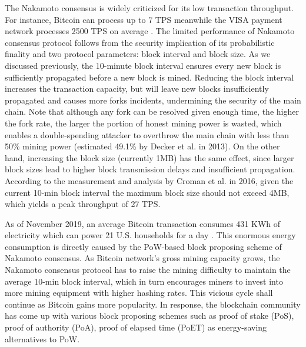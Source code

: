 The Nakamoto consensus is widely criticized for its low transaction throughput. For instance, Bitcoin can process up to 7 TPS meanwhile the VISA payment network processes 2500 TPS on average . The limited performance of Nakamoto consensus protocol follows from the security implication of its probabilistic finality and two protocol parameters: block interval and block size. As we discussed previously, the 10-minute block interval ensures every new block is sufficiently propagated before a new block is mined. Reducing the block interval increases the transaction capacity, but will leave new blocks insufficiently propagated and causes more forks incidents, undermining the security of the main chain. Note that although any fork can be resolved given enough time, the higher the fork rate, the larger the portion of honest mining power is wasted, which enables a double-spending attacker to overthrow the main chain with less than 50\% mining power (estimated 49.1\% by Decker et al.  in 2013). On the other hand, increasing the block size (currently 1MB) has the same effect, since larger block sizes lead to higher block transmission delays and  insufficient propagation. According to the measurement and analysis by Croman et al.  in 2016, given the current 10-min block interval the maximum block size should not exceed 4MB, which yields a peak throughput of 27 TPS.

As of November 2019, an average Bitcoin transaction consumes 431 KWh of electricity which can power 21 U.S. households for a day . This enormous energy consumption is directly caused by the PoW-based block proposing scheme of Nakamoto consensus. As Bitcoin network's gross mining capacity grows, the Nakamoto consensus protocol has to raise the mining difficulty to maintain the average 10-min block interval, which in turn encourages miners to invest into more mining equipment with higher hashing rates. This vicious cycle shall continue as Bitcoin gains more popularity. In response, the blockchain community has come up with various block proposing schemes such as proof of stake (PoS), proof of authority (PoA), proof of elapsed time (PoET) as energy-saving alternatives to PoW.

